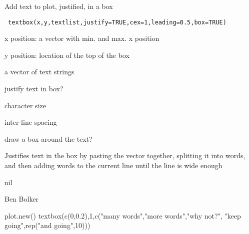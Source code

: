 \begin{Description}\relax
Add text to plot, justified, in a box
\end{Description}
\begin{Usage}
\begin{verbatim}
 textbox(x,y,textlist,justify=TRUE,cex=1,leading=0.5,box=TRUE)
\end{verbatim}
\end{Usage}
\begin{Arguments}
\begin{ldescription}
\item[\code{x}] x position: a vector with min. and max. x position
\item[\code{y}] y position: location of the top of the box
\item[\code{textlist}] a vector of text strings
\item[\code{justify}] justify text in box?
\item[\code{cex}] character size
\item[\code{leading}] inter-line spacing
\item[\code{box}] draw a box around the text?
\end{ldescription}
\end{Arguments}
\begin{Details}\relax
Justifies text in the box by pasting the vector together,
splitting it into words, and then adding words to the current
line until the line is wide enough
\end{Details}
\begin{Value}
nil
\end{Value}
\begin{Author}\relax
Ben Bolker
\end{Author}
\begin{Examples}
\begin{ExampleCode}
 plot.new()
 textbox(c(0,0.2),1,c("many words","more words","why not?",
                      "keep going",rep("and going",10)))
\end{ExampleCode}
\end{Examples}

